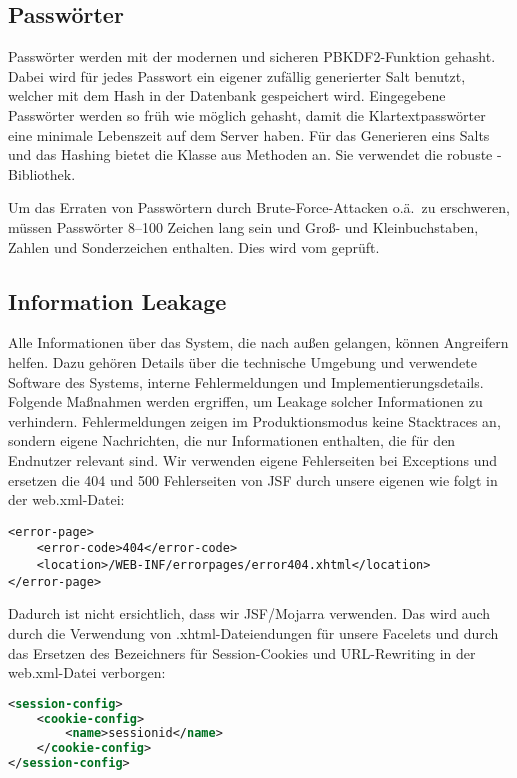 \subsection{Passwörter}\label{subsec:passwords}
Passwörter werden mit der modernen und sicheren PBKDF2-Funktion gehasht.
Dabei wird für jedes Passwort ein eigener zufällig generierter Salt benutzt, welcher mit dem Hash in der Datenbank gespeichert wird.
Eingegebene Passwörter werden so früh wie möglich gehasht, damit die Klartextpasswörter eine minimale Lebenszeit auf dem Server haben.
Für das Generieren eins Salts und das Hashing bietet die Klasse  aus 
Methoden an.
Sie verwendet die robuste -Bibliothek.

Um das Erraten von Passwörtern durch Brute-Force-Attacken o.ä.\ zu erschweren, müssen Passwörter 8--100 Zeichen lang sein und Groß- und Kleinbuchstaben, Zahlen und Sonderzeichen enthalten.
Dies wird vom  geprüft.

\subsection{Information Leakage}\label{subsec:information-leakage}
Alle Informationen über das System, die nach außen gelangen, können Angreifern helfen.
Dazu gehören Details über die technische Umgebung und verwendete Software des Systems, interne Fehlermeldungen und Implementierungsdetails.
Folgende Maßnahmen werden ergriffen, um Leakage solcher Informationen zu verhindern.
Fehlermeldungen zeigen im Produktionsmodus keine Stacktraces an, sondern eigene Nachrichten, die nur Informationen enthalten, die für den Endnutzer relevant sind.
Wir verwenden eigene Fehlerseiten bei Exceptions und ersetzen die 404 und 500 Fehlerseiten von JSF durch unsere eigenen wie folgt in der web.xml-Datei:
    {\small
\begin{lstlisting}
<error-page>
    <error-code>404</error-code>
    <location>/WEB-INF/errorpages/error404.xhtml</location>
</error-page>
\end{lstlisting}
}
Dadurch ist nicht ersichtlich, dass wir JSF/Mojarra verwenden.
Das wird auch durch die Verwendung von .xhtml-Dateiendungen für unsere Facelets und durch das Ersetzen des Bezeichners  für Session-Cookies und URL-Rewriting in der web.xml-Datei verborgen:

\begin{minipage}{\linewidth}
    {\small
\begin{lstlisting}[language=XML]
<session-config>
    <cookie-config>
        <name>sessionid</name>
    </cookie-config>
</session-config>
    \end{lstlisting}
}
\end{minipage}

